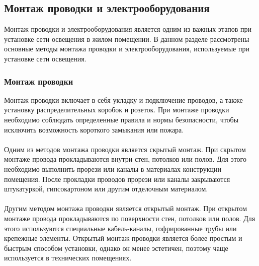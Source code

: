\documentclass{article}
\begin{document}
\subsection{Монтаж проводки и электрооборудования}
Монтаж проводки и электрооборудования является одним из важных этапов при установке сети освещения в жилом помещении. В данном разделе рассмотрены основные методы монтажа проводки и электрооборудования, используемые при установке сети освещения.
\subsubsection{Монтаж проводки}
Монтаж проводки включает в себя укладку и подключение проводов, а также установку распределительных коробок и розеток. При монтаже проводки необходимо соблюдать определенные правила и нормы безопасности, чтобы исключить возможность короткого замыкания или пожара.\\
~\\
Одним из методов монтажа проводки является скрытый монтаж. При скрытом монтаже провода прокладываются внутри стен, потолков или полов. Для этого необходимо выполнить прорези или каналы в материалах конструкции помещения. После прокладки проводов прорези или каналы закрываются штукатуркой, гипсокартоном или другим отделочным материалом.\\
~\\
Другим методом монтажа проводки является открытый монтаж. При открытом монтаже провода прокладываются по поверхности стен, потолков или полов. Для этого используются специальные кабель-каналы, гофрированные трубы или крепежные элементы. Открытый монтаж проводки является более простым и быстрым способом установки, однако он менее эстетичен, поэтому чаще используется в технических помещениях.
\end{document}

